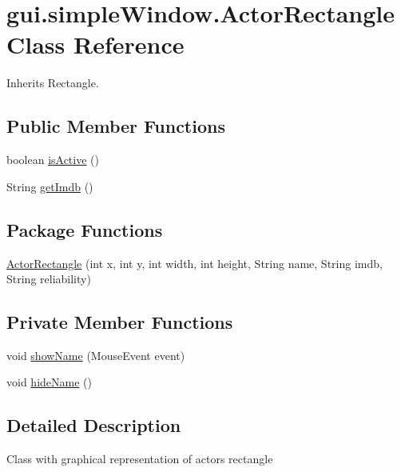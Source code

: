\hypertarget{classgui_1_1simple_window_1_1_actor_rectangle}{}\section{gui.\+simple\+Window.\+Actor\+Rectangle Class Reference}
\label{classgui_1_1simple_window_1_1_actor_rectangle}


Inherits Rectangle.

\subsection*{Public Member Functions}
\begin{DoxyCompactItemize}
\item 
boolean \hyperlink{classgui_1_1simple_window_1_1_actor_rectangle_a7cc761d58a86e44276b4f731210aadfd}{is\+Active} ()
\item 
String \hyperlink{classgui_1_1simple_window_1_1_actor_rectangle_ada728600a6061eb6791079f693d88b1f}{get\+Imdb} ()
\end{DoxyCompactItemize}
\subsection*{Package Functions}
\begin{DoxyCompactItemize}
\item 
\hyperlink{classgui_1_1simple_window_1_1_actor_rectangle_a884bbc03cd8a7620c6789a431b9f7473}{Actor\+Rectangle} (int x, int y, int width, int height, String name, String imdb, String reliability)
\end{DoxyCompactItemize}
\subsection*{Private Member Functions}
\begin{DoxyCompactItemize}
\item 
void \hyperlink{classgui_1_1simple_window_1_1_actor_rectangle_acfb2dc23c718ca61d9eebf037e97e246}{show\+Name} (Mouse\+Event event)
\item 
void \hyperlink{classgui_1_1simple_window_1_1_actor_rectangle_ad84482da42babb5f8216f8cd99f4626e}{hide\+Name} ()
\end{DoxyCompactItemize}


\subsection{Detailed Description}
Class with graphical representation of actor\textquotesingle{}s rectangle 

